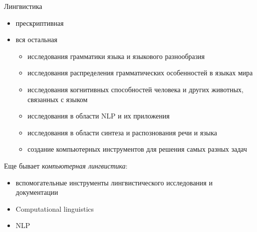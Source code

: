 \documentclass[13pt, t]{beamer}
\begin{document}
\begin{frame}{Лингвистика}
\begin{itemize}
\item прескриптивная \pause
\item вся остальная
\begin{itemize}
\item исследования грамматики языка и языкового разнообразия
\item исследования распределения грамматических особенностей в языках мира
\item исследования когнитивных способностей человека и других животных, связанных с языком
\item исследования в области NLP и их приложения
\item исследования в области синтеза и распознования речи и языка
\item создание компьютерных инструментов для решения самых разных задач
\end{itemize}
\end{itemize}
\vfill
Еще бывает \textit{компьютерная лингвистика}:
\begin{itemize}
\item вспомогательные инструменты лингвистического исследования и документации
\item Computational linguistics
\item NLP
\end{itemize}
\end{frame}

\end{document}
